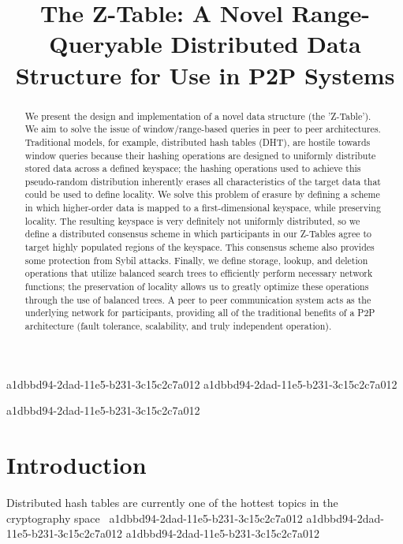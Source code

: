 \documentclass[12pt]{article}
\title{The Z-Table: A Novel Range-Queryable Distributed Data Structure for Use in P2P Systems}
\begin{document}
\maketitle
a1dbbd94-2dad-11e5-b231-3c15c2c7a012
a1dbbd94-2dad-11e5-b231-3c15c2c7a012\begin{abstract}
We present the design and implementation of a novel data structure (the 'Z-Table'). We aim to solve the issue of window/range-based queries in peer to peer architectures. Traditional models, for example,  distributed hash tables (DHT), are hostile towards window queries because their hashing operations are designed to uniformly distribute stored data across a defined keyspace; the hashing operations used to achieve this pseudo-random distribution inherently erases all characteristics of the target data that could be used to define locality. We solve this problem of erasure by defining a scheme in which higher-order data is mapped to a first-dimensional keyspace, while preserving locality. The resulting keyspace is very definitely not uniformly distributed, so we define a distributed consensus scheme in which participants in our Z-Tables agree to target highly populated regions of the keyspace. This consensus scheme also provides some protection from Sybil attacks. Finally, we define storage, lookup, and deletion operations that utilize balanced search trees to efficiently perform necessary network functions; the preservation of locality allows us to greatly optimize these operations through the use of balanced trees. A peer to peer communication system acts as the underlying network for participants, providing all of the traditional benefits of a P2P architecture (fault tolerance, scalability, and truly independent operation).
\end{abstract}
a1dbbd94-2dad-11e5-b231-3c15c2c7a012

\newpage
\section{Introduction}
Distributed hash tables are currently one of the hottest topics in the cryptography space~\cite{Stoica:2001dj,Rowstron:2001ea,Ratnasamy:2001wn}
a1dbbd94-2dad-11e5-b231-3c15c2c7a012
a1dbbd94-2dad-11e5-b231-3c15c2c7a012\printbibliography
a1dbbd94-2dad-11e5-b231-3c15c2c7a012
\end{document}
